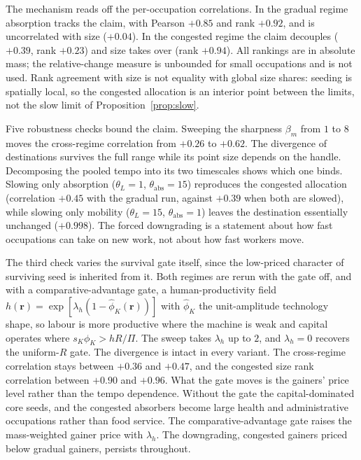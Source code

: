 \documentclass[12pt, a4paper]{article}
\newcommand{\rr}{\mathbf{r}}
\begin{document}
The mechanism reads off the per-occupation correlations. In the gradual regime absorption tracks the claim, with Pearson
$+0.85$ and rank $+0.92$, and is uncorrelated with size ($+0.04$). In the
congested regime the claim decouples ($+0.39$, rank $+0.23$) and size
takes over (rank $+0.94$). All rankings are in
absolute mass; the relative-change measure is unbounded for small
occupations and is not used. Rank agreement with size is not equality
with global size shares: seeding is spatially local, so the congested
allocation is an interior point between the limits, not the
slow limit of Proposition~\ref{prop:slow}.

Five robustness checks bound the claim. Sweeping the sharpness
$\beta_m$ from $1$ to $8$ moves the cross-regime correlation from
$+0.26$ to $+0.62$. The divergence of destinations survives the full
range while its point size depends on the handle. Decomposing the
pooled tempo into its two timescales shows which one binds. Slowing only absorption
($\theta_L = 1$, $\theta_{\text{abs}} = 15$) reproduces the congested
allocation (correlation $+0.45$ with the gradual run, against $+0.39$
when both are slowed), while slowing
only mobility ($\theta_L = 15$, $\theta_{\text{abs}} = 1$) leaves the
destination essentially unchanged ($+0.998$). The forced downgrading is a
statement about how fast occupations can take on new work, not about how
fast workers move.

The third check varies the survival gate itself, since the low-priced
character of surviving seed is inherited from it. Both regimes are rerun with the gate off, and with a
comparative-advantage gate, a human-productivity field
$h(\rr) = \exp[\lambda_h(1-\hat\phi_K(\rr))]$ with $\hat\phi_K$ the
unit-amplitude technology shape, so labour is more productive where the
machine is weak and capital operates where $s_K\phi_K > h R/\Pi$. The
sweep takes $\lambda_h$ up to $2$, and $\lambda_h = 0$ recovers the
uniform-$R$ gate. The divergence is intact in every variant. The
cross-regime correlation stays between $+0.36$ and $+0.47$, and the
congested size rank correlation between $+0.90$ and $+0.96$. What the
gate moves is the gainers' price level rather than the tempo
dependence. Without the gate the capital-dominated core seeds, and the
congested absorbers become large health and administrative occupations
rather than food service. The comparative-advantage gate raises the
mass-weighted gainer price with $\lambda_h$. The downgrading, congested
gainers priced below gradual gainers, persists throughout.
\end{document}

